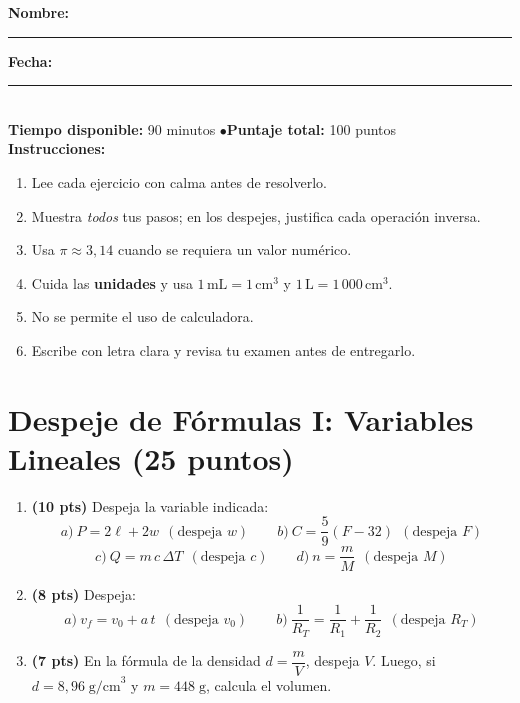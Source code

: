 \documentclass[12pt, letterpaper]{article}
\begin{document}


\vspace{4pt}
\begin{cuadroinfo}
  \small
  \textbf{Nombre:} \rule{0.55\linewidth}{0.4pt} \quad \textbf{Fecha:} \rule{0.15\linewidth}{0.4pt} \\[6pt]
  \textbf{Tiempo disponible:} 90 minutos \quad$\bullet$\quad \textbf{Puntaje total:} 100 puntos \\[4pt]
  \textbf{Instrucciones:}
  \begin{enumerate}[leftmargin=*]
    \item Lee cada ejercicio con calma antes de resolverlo.
    \item Muestra \emph{todos} tus pasos; en los despejes, justifica cada operación inversa.
    \item Usa $\pi \approx 3{,}14$ cuando se requiera un valor numérico.
    \item Cuida las \textbf{unidades} y usa $1\,\text{mL} = 1\,\text{cm}^3$ y $1\,\text{L} = 1\,000\,\text{cm}^3$.
    \item No se permite el uso de calculadora.
    \item Escribe con letra clara y revisa tu examen antes de entregarlo.
  \end{enumerate}
\end{cuadroinfo}

\vspace{8pt}

\section{Despeje de Fórmulas I: Variables Lineales (25 puntos)}

\begin{enumerate}[leftmargin=*]
  \item \textbf{(10 pts)} Despeja la variable indicada:
        \[
          a)\ P = 2\ell + 2w \ \ (\text{despeja } w) \qquad
          b)\ C = \frac{5}{9}(F - 32) \ \ (\text{despeja } F)
        \]
        \[
          c)\ Q = m\,c\,\Delta T \ \ (\text{despeja } c) \qquad
          d)\ n = \frac{m}{M} \ \ (\text{despeja } M)
        \]

  \item \textbf{(8 pts)} Despeja:
        \[
          a)\ v_f = v_0 + a\,t \ \ (\text{despeja } v_0) \qquad
          b)\ \frac{1}{R_T} = \frac{1}{R_1} + \frac{1}{R_2} \ \ (\text{despeja } R_T)
        \]

  \item \textbf{(7 pts)} En la fórmula de la densidad $d = \dfrac{m}{V}$, despeja $V$. Luego, si $d = 8{,}96\;\text{g/cm}^3$ y $m = 448\;\text{g}$, calcula el volumen.
\end{enumerate}
\end{document}
